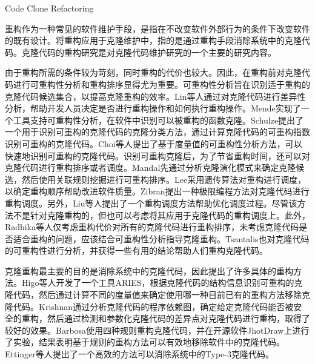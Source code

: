 {Code Clone Refactoring}
\label{ref-clonerefactoring}

重构作为一种常见的软件维护手段，是指在不改变软件外部行为的条件下改变软件的既有设计\cite{kerievsky2006重构与模式}。将重构应用于克隆维护中，指的是通过重构手段消除系统中的克隆代码。克隆代码的重构研究是对克隆代码维护研究的一个主要的研究内容。

由于重构所需的条件较为苛刻，同时重构的代价也较大。因此，在重构前对克隆代码进行可重构性分析和重构排序显得尤为重要。可重构性分析旨在识别适于重构的克隆代码候选集合，以提高克隆重构的效率\cite{lin2014detecting,mende2009evaluation,schulze2008towards,choi2011extracting}。Lin等人通过对克隆代码进行差异性分析，帮助开发人员决定是否进行重构操作和如何执行重构操作\cite{lin2014detecting}。Mende实现了一个工具支持可重构性分析，在软件中识别可以被重构的函数克隆\cite{mende2009evaluation}。Schulze提出了一个用于识别可重构的克隆代码的克隆分类方法，通过计算克隆代码的可重构指数识别可重构的克隆代码\cite{schulze2008towards}。Choi等人提出了基于度量值的可重构性分析方法，可以快速地识别可重构的克隆代码\cite{choi2011extracting}。识别可重构克隆后，为了节省重构时间，还可以对克隆代码进行重构排序或者调度\cite{mandal2014automatic,lee2011automated,zibran2011constraint}。Mandal先通过分析克隆演化模式来确定克隆候选，然后使用关联规则挖掘进行可重构排序\cite{mandal2014automatic}。Lee采用遗传算法对重构进行调度，以确定重构顺序帮助改进软件质量\cite{lee2011automated}。Zibran提出一种极限编程方法对克隆代码进行重构调度\cite{zibran2011constraint}。另外，Liu等人提出了一个重构调度方法帮助优化调度过程\cite{liu2012schedule}。尽管该方法不是针对克隆重构的，但也可以考虑将其应用于克隆代码的重构调度上。此外，Radhika等人仅考虑重构代价对所有的克隆代码进行重构排序，未考虑克隆代码是否适合重构的问题\cite{venkatasubramanyam2013prioritizing}，应该结合可重构性分析指导克隆重构。Tsantalis也对克隆代码的可重构性进行分析，并获得一些有用的结论帮助人们重构克隆代码\cite{tsantalis2015assessing}。%

克隆重构最主要的目的是消除系统中的克隆代码，因此提出了许多具体的重构方法\cite{higo2008metric,krishnan2014unification,barbosa2013removing,ettinger2017efficient}。Higo等人开发了一个工具ARIES，根据克隆代码的结构信息识别可重构的克隆代码，然后通过计算不同的度量值来确定使用哪一种目前已有的重构方法移除克隆代码\cite{higo2008metric}。Krishnan通过分析克隆代码的程序依赖图，确定给定克隆代码能否被安全的重构，然后通过检测和参数化克隆代码的差异点对克隆代码进行重构，取得了较好的效果\cite{krishnan2014unification}。Barbosa使用四种规则重构克隆代码，并在开源软件JhotDraw上进行了实验，结果表明基于规则的重构方法可以有效地移除软件中的克隆代码\cite{barbosa2013removing}。Ettinger等人提出了一个高效的方法可以消除系统中的Type-3克隆代码\cite{ettinger2017efficient}。

